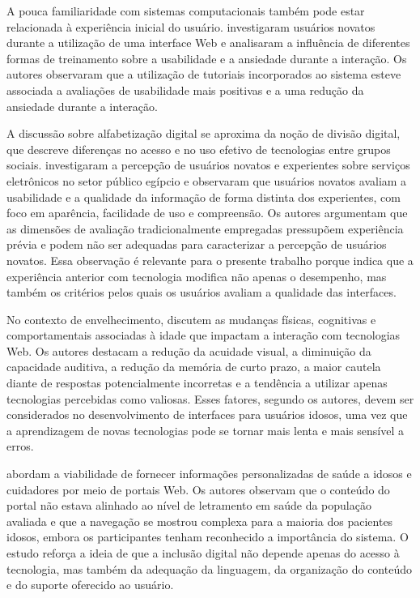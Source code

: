A pouca familiaridade com sistemas computacionais também pode estar relacionada à experiência inicial do usuário. \cite{cowan2011exploring} investigaram usuários novatos durante a utilização de uma interface Web e analisaram a influência de diferentes formas de treinamento sobre a usabilidade e a ansiedade durante a interação. Os autores observaram que a utilização de tutoriais incorporados ao sistema esteve associada a avaliações de usabilidade mais positivas e a uma redução da ansiedade durante a interação.

A discussão sobre alfabetização digital se aproxima da noção de divisão digital, que descreve diferenças no acesso e no uso efetivo de tecnologias entre grupos sociais. \cite{nosseir2011novice} investigaram a percepção de usuários novatos e experientes sobre serviços eletrônicos no setor público egípcio e observaram que usuários novatos avaliam a usabilidade e a qualidade da informação de forma distinta dos experientes, com foco em aparência, facilidade de uso e compreensão. Os autores argumentam que as dimensões de avaliação tradicionalmente empregadas pressupõem experiência prévia e podem não ser adequadas para caracterizar a percepção de usuários novatos. Essa observação é relevante para o presente trabalho porque indica que a experiência anterior com tecnologia modifica não apenas o desempenho, mas também os critérios pelos quais os usuários avaliam a qualidade das interfaces.

No contexto de envelhecimento, \cite{ahmad2013teaching} discutem as mudanças físicas, cognitivas e comportamentais associadas à idade que impactam a interação com tecnologias Web. Os autores destacam a redução da acuidade visual, a diminuição da capacidade auditiva, a redução da memória de curto prazo, a maior cautela diante de respostas potencialmente incorretas e a tendência a utilizar apenas tecnologias percebidas como valiosas. Esses fatores, segundo os autores, devem ser considerados no desenvolvimento de interfaces para usuários idosos, uma vez que a aprendizagem de novas tecnologias pode se tornar mais lenta e mais sensível a erros.

\cite{barron2013feasibility} abordam a viabilidade de fornecer informações personalizadas de saúde a idosos e cuidadores por meio de portais Web. Os autores observam que o conteúdo do portal não estava alinhado ao nível de letramento em saúde da população avaliada e que a navegação se mostrou complexa para a maioria dos pacientes idosos, embora os participantes tenham reconhecido a importância do sistema. O estudo reforça a ideia de que a inclusão digital não depende apenas do acesso à tecnologia, mas também da adequação da linguagem, da organização do conteúdo e do suporte oferecido ao usuário.

